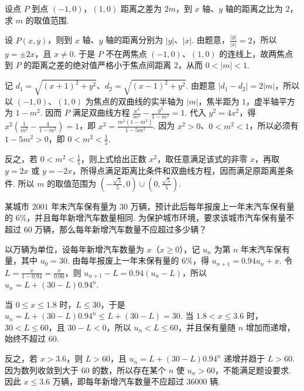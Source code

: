 \begin{problem}
设点 \(P\) 到点 \((-1,0)\)，\((1,0)\) 距离之差为 \(2m\)，到 \(x\) 轴、\(y\) 轴的距离之比为 2，求 \(m\) 的取值范围.
\end{problem}

\begin{solution}
设 \(P(x,y)\)，则到 \(x\) 轴、\(y\) 轴的距离分别为 \(|y|\)、\(|x|\). 由题意，\(\displaystyle\frac{|y|}{|x|}=2\)，所以 \(y=\pm2x\)，且 \(x\neq0\). 于是 \(P\) 不在两焦点 \((-1,0)\)、\((1,0)\) 的连线上，故两焦点到 \(P\) 的距离之差的绝对值严格小于焦点间距离 \(2\)，从而 \(0<|m|<1\).

记 \(d_1=\sqrt{(x+1)^2+y^2}\)、\(d_2=\sqrt{(x-1)^2+y^2}\). 由题意 \(|d_1-d_2|=2|m|\)，所以以 \((-1,0)\)、\((1,0)\) 为焦点的双曲线的实半轴为 \(|m|\)，焦半距为 \(1\)，虚半轴平方为 \(1-m^2\). 因而 \(P\) 满足双曲线方程 \(\displaystyle\frac{x^2}{m^2}-\frac{y^2}{1-m^2}=1\). 代入 \(y^2=4x^2\)，得
\(\displaystyle x^2\left(\frac1{m^2}-\frac4{1-m^2}\right)=1\)，即 \(\displaystyle x^2=\frac{m^2(1-m^2)}{1-5m^2}\). 因为 \(x^2>0\)、\(0<m^2<1\)，所以必须有 \(1-5m^2>0\)，即 \(0<m^2<\frac15\).

反之，若 \(0<m^2<\frac15\)，则上式给出正数 \(x^2\)，取任意满足该式的非零 \(x\)，再取 \(y=2x\) 或 \(y=-2x\)，所得点满足距离比条件和双曲线方程，因而满足原距离差条件. 所以 \(m\) 的取值范围为 \(\displaystyle\left(-\frac{\sqrt5}{5},0\right)\cup\left(0,\frac{\sqrt5}{5}\right)\).
\end{solution}

\begin{problem}
某城市 \(2001\text{ 年}\)末汽车保有量为 \(30\text{ 万辆}\)，预计此后每年报废上一年末汽车保有量的 \(6\%\)，并且每年新增汽车数量相同. 为保护城市环境，要求该城市汽车保有量不超过 \(60\text{ 万辆}\)，那么每年新增汽车数量不应超过多少辆？
\end{problem}

\begin{solution}
以万辆为单位，设每年新增汽车数量为 \(x\)（\(x\geqslant0\)），记 \(u_n\) 为第 \(n\) 年末汽车保有量，其中 \(u_0=30\). 由每年报废上一年末保有量的 \(6\%\)，得 \(\displaystyle u_{n+1}=0.94u_n+x\). 令 \(\displaystyle L=\frac{x}{1-0.94}=\frac{x}{0.06}\)，则
\(\displaystyle u_{n+1}-L=0.94(u_n-L)\)，所以 \(\displaystyle u_n=L+(30-L)0.94^n\).

当 \(0\leqslant x\leqslant1.8\) 时，\(L\leqslant30\)，于是 \(\displaystyle u_n=L+(30-L)0.94^n\leqslant L+(30-L)=30\). 当 \(1.8<x\leqslant3.6\) 时，\(30<L\leqslant60\)，且 \(30-L<0\)，所以 \(u_n<L\leqslant60\)，并且保有量随 \(n\) 增加而递增，始终不超过 \(60\).

反之，若 \(x>3.6\)，则 \(L>60\)，且 \(u_n=L+(30-L)0.94^n\) 递增并趋于 \(L>60\). 因为数列收敛到大于 \(60\) 的数，所以存在某个 \(n\) 使 \(u_n>60\)，不能满足题设要求. 因此 \(x\leqslant3.6\) 万辆，即每年新增汽车数量不应超过 \(36000\) 辆.
\end{solution}


